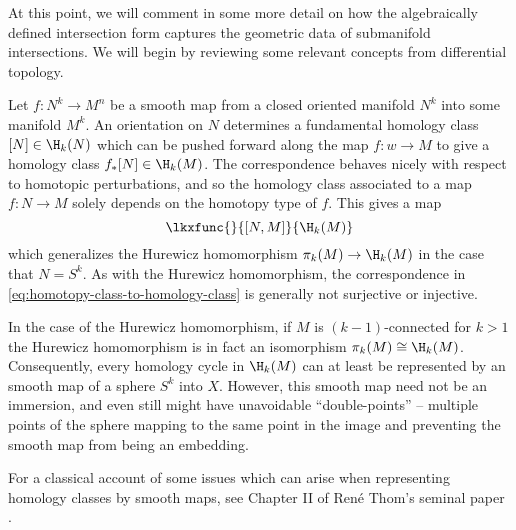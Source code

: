 At this point, we will comment in some more detail on how the algebraically defined intersection form captures the geometric data of submanifold intersections. We will begin by reviewing some relevant concepts from differential topology.

Let $f : N^k\to M^n$ be a smooth map from a closed oriented manifold $N^k$ into some manifold $M^k$. An orientation on $N$ determines a fundamental homology class $[N]\in \H_k(N)$ which can be pushed forward along the map $f : w \to M$ to give a homology class $f_* [N]\in \H_k(M)$.
The correspondence behaves nicely with respect to homotopic perturbations, and so
the homology class associated to a map $f : N \to M$ solely depends on the homotopy type of $f$. This gives a map
\begin{equation}\label{eq:homotopy-class-to-homology-class}
	\lkxfunc{}{[N,M]}{\H_k(M)}
\end{equation}
which generalizes the Hurewicz homomorphism $\pi_k(M) \to \H_k(M)$ in the case that $N=S^k$.
As with the Hurewicz homomorphism, the correspondence in \cref{eq:homotopy-class-to-homology-class} is generally not surjective or injective.

In the case of the Hurewicz homomorphism, if $M$ is $(k-1)$-connected for $k > 1$ the Hurewicz homomorphism is in fact an isomorphism $\pi_{k}(M) \cong \H_{k}(M)$. Consequently, every homology cycle in $\H_{k}(M)$ can at least be represented by an smooth map of a sphere $S^{k}$ into $X$. However, this smooth map need not be an immersion, and even still might have unavoidable ``double-points'' -- multiple points of the sphere mapping to the same point in the image and preventing the smooth map from being an embedding.

\begin{remark}
	For a classical account of some issues which can arise when representing homology classes by smooth maps, see Chapter II of Ren\'e Thom's seminal paper \cite{thom1954}.
\end{remark}

